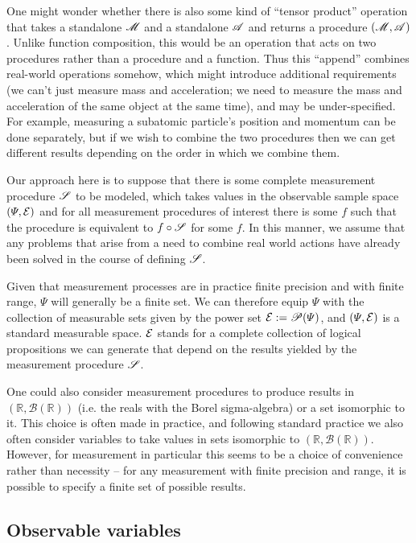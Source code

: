 One might wonder whether there is also some kind of ``tensor product'' operation that takes a standalone $\mathscr{M}$ and a standalone $\mathscr{A}$ and returns a procedure $(\mathscr{M},\mathscr{A})$. Unlike function composition, this would be an operation that acts on two procedures rather than a procedure and a function. Thus this ``append'' combines real-world operations somehow, which might introduce additional requirements (we can't just measure mass and acceleration; we need to measure the mass and acceleration of the same object at the same time), and may be under-specified. For example, measuring a subatomic particle's position and momentum can be done separately, but if we wish to combine the two procedures then we can get different results depending on the order in which we combine them.

Our approach here is to suppose that there is some complete measurement procedure $\mathscr{S}$ to be modeled, which takes values in the observable sample space $(\Psi,\mathcal{E})$ and for all measurement procedures of interest there is some $f$ such that the procedure is equivalent to $f\circ \mathscr{S}$ for some $f$. In this manner, we assume that any problems that arise from a need to combine real world actions have already been solved in the course of defining $\mathscr{S}$.

Given that measurement processes are in practice finite precision and with finite range, $\Psi$ will generally be a finite set. We can therefore equip $\Psi$ with the collection of measurable sets given by the power set $\mathcal{E}:=\mathscr{P}(\Psi)$, and $(\Psi,\mathcal{E})$ is a standard measurable space. $\mathcal{E}$ stands for a complete collection of logical propositions we can generate that depend on the results yielded by the measurement procedure $\mathscr{S}$.

One could also consider measurement procedures to produce results in $(\mathbb{R},\mathcal{B}(\mathbb{R}))$ (i.e. the reals with the Borel sigma-algebra) or a set isomorphic to it. This choice is often made in practice, and following standard practice we also often consider variables to take values in sets isomorphic to $(\mathbb{R},\mathcal{B}(\mathbb{R}))$. However, for measurement in particular this seems to be a choice of convenience rather than necessity -- for any measurement with finite precision and range, it is possible to specify a finite set of possible results.

\subsection{Observable variables}

